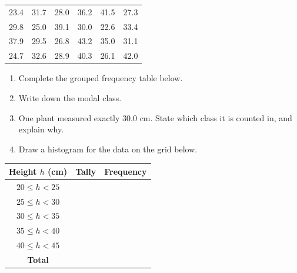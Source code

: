 \documentclass[12pt, twoside]{article}
\begin{document}
\begin{enumerate}[itemsep=0.15cm]
{\small
\begin{center}
\setlength{\tabcolsep}{8pt}
\begin{tabular}{cccccc}
23.4 & 31.7 & 28.0 & 36.2 & 41.5 & 27.3 \\
29.8 & 25.0 & 39.1 & 30.0 & 22.6 & 33.4 \\
37.9 & 29.5 & 26.8 & 43.2 & 35.0 & 31.1 \\
24.7 & 32.6 & 28.9 & 40.3 & 26.1 & 42.0 \\
\end{tabular}
\end{center}}

\begin{enumerate}[itemsep=0.1cm]
  \item Complete the grouped frequency table below.
  \item Write down the modal class.
  \item One plant measured exactly $30.0$ cm. State which class it is
  counted in, and explain why.
  \item Draw a histogram for the data on the grid below.
\end{enumerate}

{\renewcommand{\arraystretch}{1.7}
\begin{center}
\begin{tabular}{|c|p{4.2cm}|c|}
\hline
\textbf{Height $h$ (cm)} & \hfil \textbf{Tally} & \textbf{Frequency} \\ \hline
$20 \le h < 25$ & & \\ \hline
$25 \le h < 30$ & & \\ \hline
$30 \le h < 35$ & & \\ \hline
$35 \le h < 40$ & & \\ \hline
$40 \le h < 45$ & & \\ \hline
\textbf{Total}  & & \\ \hline
\end{tabular}
\end{center}}

\vspace{-0.2cm}

\begin{center}
\end{center}

\end{enumerate}
\end{document}
